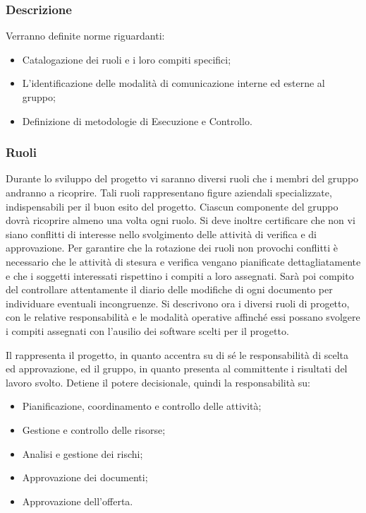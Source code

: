 \documentclass[12pt,a4paper]{article}
\begin{document}
\subsubsection{Descrizione} %

Verranno definite norme riguardanti:
\begin{itemize}
  \item Catalogazione dei ruoli e i loro compiti specifici;
  \item L’identificazione delle modalità di comunicazione interne ed esterne al gruppo;
  \item Definizione di metodologie di Esecuzione e Controllo.
\end{itemize}

\subsubsection{Ruoli}\label{Ruoli}

Durante lo sviluppo del progetto vi saranno diversi ruoli che i membri del gruppo andranno a ricoprire. Tali ruoli rappresentano figure aziendali specializzate, indispensabili per il buon esito del progetto. Ciascun componente del gruppo dovrà ricoprire almeno una volta ogni ruolo. Si deve inoltre certificare che non vi siano conflitti di interesse nello svolgimento delle attività di verifica e di approvazione.
Per garantire che la rotazione dei ruoli non provochi conflitti è necessario che le attività di stesura e verifica vengano pianificate dettagliatamente e che i soggetti interessati rispettino i compiti a loro assegnati. Sarà poi compito del \VR{} controllare attentamente il diario delle modifiche di ogni documento per individuare eventuali incongruenze.
Si descrivono ora i diversi ruoli di progetto, con le relative responsabilità e le modalità operative affinché essi possano svolgere i compiti assegnati con l’ausilio dei software scelti per il progetto.

Il \PM{} rappresenta il progetto, in quanto accentra su di sé le responsabilità di scelta ed approvazione, ed il gruppo, in quanto presenta al committente i risultati del lavoro svolto.
Detiene il potere decisionale, quindi la responsabilità su:
\begin{itemize}
  \item Pianificazione, coordinamento e controllo delle attività;
  \item Gestione e controllo delle risorse;
  \item Analisi e gestione dei rischi;
  \item Approvazione dei documenti;
  \item Approvazione dell'offerta.
\end{itemize}
\end{document}

